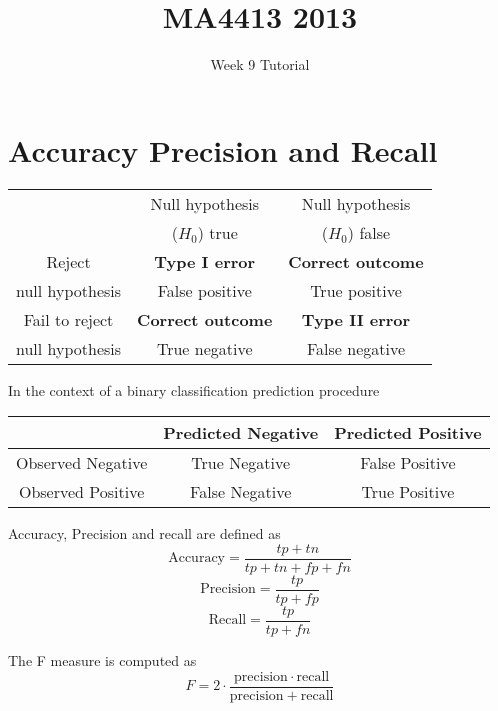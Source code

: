 \documentclass[]{article}
\title{MA4413 2013}
\author{Week 9 Tutorial}
\begin{document}
\maketitle
\section{Accuracy Precision and Recall}
\begin{center}
\begin{tabular}{|c|c|c|} \hline
               & Null hypothesis & Null hypothesis   \\
               & ($H_0$) true	 & ($H_0$) false \\ \hline
Reject 	       & \textbf{Type I error }   & \textbf{Correct outcome} \\
null hypothesis& False positive  & True positive \\ \hline
Fail to reject & \textbf{Correct outcome} & \textbf{Type II error} \\
null hypothesis & True negative  & False negative \\ \hline
\end{tabular} 
\end{center}
\bigskip
In the context of a binary classification prediction procedure 
\begin{center}
\begin{tabular}{|c|c|c|}
\hline  & Predicted Negative & Predicted Positive \\ 
\hline Observed Negative & True Negative & False Positive \\ 
\hline Observed Positive & False Negative & True Positive \\ 
\hline 
\end{tabular} 
\end{center}

Accuracy, Precision and recall are defined as
\[\mbox{Accuracy}=\frac{tp+tn}{tp+tn+fp+fn} \]
\[\mbox{Precision}=\frac{tp}{tp+fp} \] 
\[\mbox{Recall}=\frac{tp}{tp+fn} \]

The F measure is computed as
\[F = 2 \cdot \frac{\mathrm{precision} \cdot \mathrm{recall}}{ \mathrm{precision} + \mathrm{recall}}\]
\end{document}
